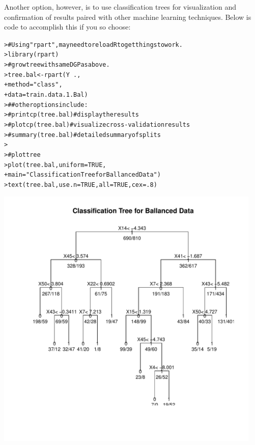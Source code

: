 \documentclass[12pt]{article}\usepackage[]{graphicx}\usepackage[]{color}
\makeatletter
\newcommand{\hlnum}[1]{\textcolor[rgb]{0.82,0.78,0.62}{#1}}%
\newcommand{\hlstr}[1]{\textcolor[rgb]{0.82,0.78,0.62}{#1}}%
\newcommand{\hlcom}[1]{\textcolor[rgb]{0.404,0.408,0.42}{#1}}%
\newcommand{\hlopt}[1]{\textcolor[rgb]{0.882,0.878,0.898}{#1}}%
\newcommand{\hlstd}[1]{\textcolor[rgb]{0.882,0.878,0.898}{#1}}%
\newcommand{\hlkwb}[1]{\textcolor[rgb]{0.902,0.675,0.196}{#1}}%
\newcommand{\hlkwc}[1]{\textcolor[rgb]{0.812,0.522,0.388}{#1}}%
\newcommand{\hlkwd}[1]{\textcolor[rgb]{0.733,0.388,0.812}{#1}}%
\newenvironment{kframe}{%
 \def\at@end@of@kframe{}%
 \ifinner\ifhmode%
  \def\at@end@of@kframe{\end{minipage}}%
  \begin{minipage}{\columnwidth}%
 \fi\fi%
 \def\FrameCommand##1{\hskip\@totalleftmargin \hskip-\fboxsep
 \colorbox{shadecolor}{##1}\hskip-\fboxsep
     \hskip-\linewidth \hskip-\@totalleftmargin \hskip\columnwidth}%
 \MakeFramed {\advance\hsize-\width
   \@totalleftmargin\z@ \linewidth\hsize
   \@setminipage}}%
 {\par\unskip\endMakeFramed%
 \at@end@of@kframe}
\newenvironment{knitrout}{}{} %
\makeatother
\begin{document}
\begin{flushleft}
Another option, however, is to use classification trees for visualization and confirmation of results paired with other machine learning techniques. Below is code to accomplish this if you so choose:


\begin{knitrout}
\color{fgcolor}\begin{kframe}
\begin{alltt}
\hlstd{> }\hlcom{# Using "rpart", may need to reload R to get things to work.}
\hlstd{> }\hlkwd{library}\hlstd{(rpart)}
\hlstd{> }\hlcom{# grow tree with same DGP as above.}
\hlstd{> }\hlstd{tree.bal} \hlkwb{<-} \hlkwd{rpart}\hlstd{(Y}\hlopt{~}\hlstd{.,}
\hlstd{+ }                  \hlkwc{method} \hlstd{=} \hlstr{"class"}\hlstd{,}
\hlstd{+ }                  \hlkwc{data} \hlstd{= train.data.1.Bal)}
\hlstd{> }\hlcom{## other options include:}
\hlstd{> }\hlcom{# printcp(tree.bal) # display the results}
\hlstd{> }\hlcom{# plotcp(tree.bal)  # visualize cross-validation results}
\hlstd{> }\hlcom{# summary(tree.bal) # detailed summary of splits}
\hlstd{> }
\hlstd{> }\hlcom{# plot tree}
\hlstd{> }\hlkwd{plot}\hlstd{(tree.bal,} \hlkwc{uniform} \hlstd{=} \hlnum{TRUE}\hlstd{,}
\hlstd{+ }     \hlkwc{main} \hlstd{=} \hlstr{"Classification Tree for Ballanced Data"}\hlstd{)}
\hlstd{> }\hlkwd{text}\hlstd{(tree.bal,} \hlkwc{use.n} \hlstd{=} \hlnum{TRUE}\hlstd{,} \hlkwc{all} \hlstd{=} \hlnum{TRUE}\hlstd{,} \hlkwc{cex} \hlstd{=} \hlnum{.8}\hlstd{)}
\end{alltt}
\end{kframe}
\includegraphics[width=5in]{figure/treesML1-1} 

\end{knitrout}
\end{flushleft}
\end{document}

